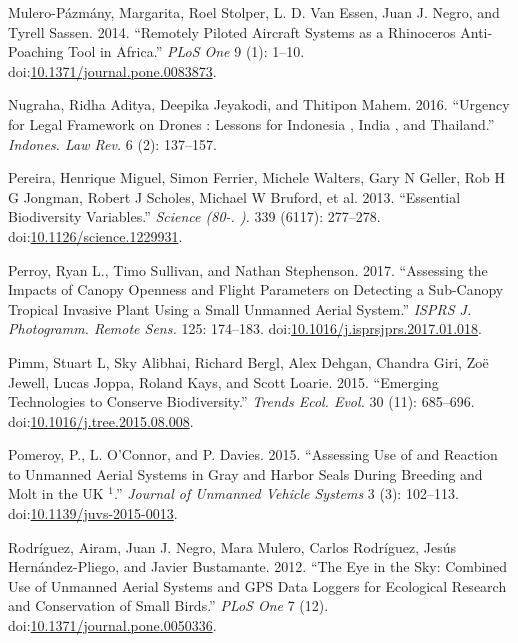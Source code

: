 \documentclass[]{interact}
\theoremstyle{plain}%
\theoremstyle{definition}
\theoremstyle{remark}
\begin{document}
\hypertarget{ref-mulero-pazmany_remotely_2014}{}
Mulero-Pázmány, Margarita, Roel Stolper, L. D. Van Essen, Juan J. Negro,
and Tyrell Sassen. 2014. ``Remotely Piloted Aircraft Systems as a
Rhinoceros Anti-Poaching Tool in Africa.'' \emph{PLoS One} 9 (1): 1--10.
doi:\href{https://doi.org/10.1371/journal.pone.0083873}{10.1371/journal.pone.0083873}.

\hypertarget{ref-nugraha_urgency_2016}{}
Nugraha, Ridha Aditya, Deepika Jeyakodi, and Thitipon Mahem. 2016.
``Urgency for Legal Framework on Drones : Lessons for Indonesia , India
, and Thailand.'' \emph{Indones. Law Rev.} 6 (2): 137--157.

\hypertarget{ref-pereira_essential_2013}{}
Pereira, Henrique Miguel, Simon Ferrier, Michele Walters, Gary N Geller,
Rob H G Jongman, Robert J Scholes, Michael W Bruford, et al. 2013.
``Essential Biodiversity Variables.'' \emph{Science (80-. ).} 339
(6117): 277--278.
doi:\href{https://doi.org/10.1126/science.1229931}{10.1126/science.1229931}.

\hypertarget{ref-perroy_assessing_2017}{}
Perroy, Ryan L., Timo Sullivan, and Nathan Stephenson. 2017. ``Assessing
the Impacts of Canopy Openness and Flight Parameters on Detecting a
Sub-Canopy Tropical Invasive Plant Using a Small Unmanned Aerial
System.'' \emph{ISPRS J. Photogramm. Remote Sens.} 125: 174--183.
doi:\href{https://doi.org/10.1016/j.isprsjprs.2017.01.018}{10.1016/j.isprsjprs.2017.01.018}.

\hypertarget{ref-pimm_emerging_2015}{}
Pimm, Stuart L, Sky Alibhai, Richard Bergl, Alex Dehgan, Chandra Giri,
Zoë Jewell, Lucas Joppa, Roland Kays, and Scott Loarie. 2015. ``Emerging
Technologies to Conserve Biodiversity.'' \emph{Trends Ecol. Evol.} 30
(11): 685--696.
doi:\href{https://doi.org/10.1016/j.tree.2015.08.008}{10.1016/j.tree.2015.08.008}.

\hypertarget{ref-pomeroy_assessing_2015}{}
Pomeroy, P., L. O'Connor, and P. Davies. 2015. ``Assessing Use of and
Reaction to Unmanned Aerial Systems in Gray and Harbor Seals During
Breeding and Molt in the UK \(^{\textrm{1}}\).'' \emph{Journal of
Unmanned Vehicle Systems} 3 (3): 102--113.
doi:\href{https://doi.org/10.1139/juvs-2015-0013}{10.1139/juvs-2015-0013}.

\hypertarget{ref-rodriguez_eye_2012}{}
Rodríguez, Airam, Juan J. Negro, Mara Mulero, Carlos Rodríguez, Jesús
Hernández-Pliego, and Javier Bustamante. 2012. ``The Eye in the Sky:
Combined Use of Unmanned Aerial Systems and GPS Data Loggers for
Ecological Research and Conservation of Small Birds.'' \emph{PLoS One} 7
(12).
doi:\href{https://doi.org/10.1371/journal.pone.0050336}{10.1371/journal.pone.0050336}.
\end{document}
